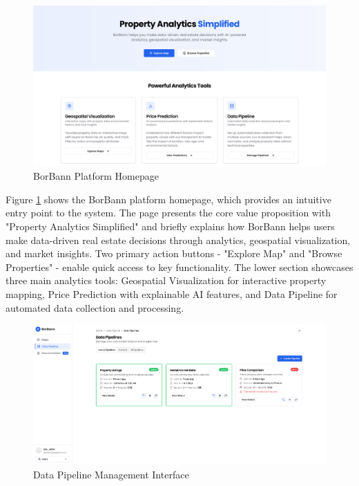 \begin{figure}[htbp]
  \centering
  \includegraphics[width=1\textwidth]{assets/ui/homepage.png}
  \caption{BorBann Platform Homepage}
  \label{fig:homepage}
\end{figure}

Figure \ref{fig:homepage} shows the BorBann platform homepage, which provides an intuitive entry point to the system. The page presents the core value proposition with "Property Analytics Simplified" and briefly explains how BorBann helps users make data-driven real estate decisions through analytics, geospatial visualization, and market insights. Two primary action buttons - "Explore Map" and "Browse Properties" - enable quick access to key functionality. The lower section showcases three main analytics tools: Geospatial Visualization for interactive property mapping, Price Prediction with explainable AI features, and Data Pipeline for automated data collection and processing.

\pagebreak
\begin{figure}[h]
\centering
\includegraphics[width=1\textwidth]{assets/ui/data-pipelines-main.png}
\caption{Data Pipeline Management Interface}
\label{fig:data-pipelines}
\end{figure}

